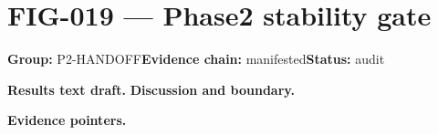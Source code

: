 \clearpage
\section{FIG-019 --- Phase2 stability gate}
\label{figpage:fig-019}
\textbf{Group:} P2-HANDOFF\quad \textbf{Evidence chain:} manifested\quad \textbf{Status:} audit

\textbf{Results text draft.} 
\textbf{Discussion and boundary.} 


\textbf{Evidence pointers.}



\vfill
